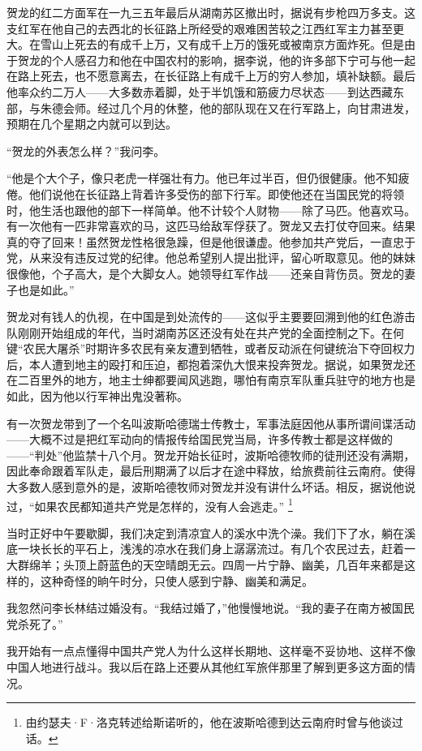 \documentclass[10pt]{book}
\begin{document}
贺龙的红二方面军在一九三五年最后从湖南苏区撤出时，据说有步枪四万多支。这支红军在他自己的去西北的长征路上所经受的艰难困苦较之江西红军主力甚至更大。在雪山上死去的有成千上万，又有成千上万的饿死或被南京方面炸死。但是由于贺龙的个人感召力和他在中国农村的影响，据李说，他的许多部下宁可与他一起在路上死去，也不愿意离去，在长征路上有成千上万的穷人参加，填补缺额。最后他率众约二万人——大多数赤着脚，处于半饥饿和筋疲力尽状态——到达西藏东部，与朱德会师。经过几个月的休整，他的部队现在又在行军路上，向甘肃进发，预期在几个星期之内就可以到达。

“贺龙的外表怎么样？”我问李。

“他是个大个子，像只老虎一样强壮有力。他已年过半百，但仍很健康。他不知疲倦。他们说他在长征路上背着许多受伤的部下行军。即使他还在当国民党的将领时，他生活也跟他的部下一样简单。他不计较个人财物——除了马匹。他喜欢马。有一次他有一匹非常喜欢的马，这匹马给敌军俘获了。贺龙又去打仗夺回来。结果真的夺了回来！虽然贺龙性格很急躁，但是他很谦虚。他参加共产党后，一直忠于党，从来没有违反过党的纪律。他总希望别人提出批评，留心听取意见。他的妹妹很像他，个子高大，是个大脚女人。她领导红军作战——还亲自背伤员。贺龙的妻子也是如此。”

贺龙对有钱人的仇视，在中国是到处流传的——这似乎主要要回溯到他的红色游击队刚刚开始组成的年代，当时湖南苏区还没有处在共产党的全面控制之下。在何键“农民大屠杀”时期许多农民有亲友遭到牺牲，或者反动派在何键统治下夺回权力后，本人遭到地主的殴打和压迫，都抱着深仇大恨来投奔贺龙。据说，如果贺龙还在二百里外的地方，地主士绅都要闻风逃跑，哪怕有南京军队重兵驻守的地方也是如此，因为他以行军神出鬼没著称。

有一次贺龙带到了一个名叫波斯哈德瑞士传教士，军事法庭因他从事所谓间谍活动——大概不过是把红军动向的情报传给国民党当局，许多传教士都是这样做的——“判处”他监禁十八个月。贺龙开始长征时，波斯哈德牧师的徒刑还没有满期，因此奉命跟着军队走，最后刑期满了以后才在途中释放，给旅费前往云南府。使得大多数人感到意外的是，波斯哈德牧师对贺龙并没有讲什么坏话。相反，据说他说过，“如果农民都知道共产党是怎样的，没有人会逃走。”
\footnote{由约瑟夫·F·洛克转述给斯诺听的，他在波斯哈德到达云南府时曾与他谈过话。}

当时正好中午要歇脚，我们决定到清凉宜人的溪水中洗个澡。我们下了水，躺在溪底一块长长的平石上，浅浅的凉水在我们身上潺潺流过。有几个农民过去，赶着一大群绵羊；头顶上蔚蓝色的天空晴朗无云。四周一片宁静、幽美，几百年来都是这样的，这种奇怪的晌午时分，只使人感到宁静、幽美和满足。

我忽然问李长林结过婚没有。“我结过婚了，”他慢慢地说。“我的妻子在南方被国民党杀死了。”

我开始有一点点懂得中国共产党人为什么这样长期地、这样毫不妥协地、这样不像中国人地进行战斗。我以后在路上还要从其他红军旅伴那里了解到更多这方面的情况。
\end{document}
